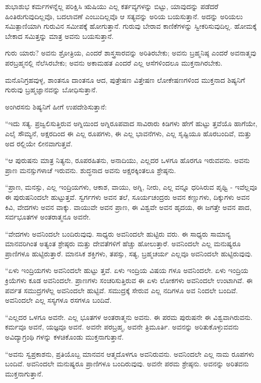 ಶುಭಾಶುಭ ಕರ್ಮಗಳನ್ನೆಲ್ಲ ಪರಿಕ್ಷಿಸಿ ಋಷಿಯು ಎಲ್ಲ ಕರ್ತವ್ಯಗಳನ್ನು ಬಿಟ್ಟು, ಯಾವುದನ್ನು ಪಡೆದರೆ ಹಿಂತಿರುಗುವುದಿಲ್ಲವೊ, ಬದಲಾವಣೆ ಎಂಬುದಿಲ್ಲವೊ ಆ ಸತ್ಯವನ್ನು ಅರಿಯ ಬಯಸುತ್ತಾನೆ. ಅದನ್ನು ಅರಿಯಲು ಸಮಿತ್ಪಾಣಿಯಾಗಿ ಗುರುವಿನ ಸಮೀಪಕ್ಕೆ ಹೋಗುತ್ತಾನೆ. ಗುರುವು ಬೇರಾವ ಕಾಣಿಕೆಗಳನ್ನು ಸ್ವೀಕರಿಸುವುದಿಲ್ಲ. ಹೋಮಕ್ಕೆ ಬೇಕಾದ ಸಮಿತ್ತನ್ನು ಮಾತ್ರ ಅವನು ಬಯಸುತ್ತಾನೆ.

ಗುರು ಯಾರು? ಅವನು ಶ್ರೋತ್ರಿಯ, ಎಂದರೆ ಶಾಸ್ತ್ರಸಾರವನ್ನು ಅರಿತಿರಬೇಕು; ಅವನು ಬ್ರಹ್ಮನಿಷ್ಠ ಎಂದರೆ ಅವನಾತ್ಮವು ಪರಬ್ರಹ್ಮನಲ್ಲಿ ನೆಲೆಸಿರಬೇಕು; ಅವನು ಅಕಾಮಹತ ಎಂದರೆ ಎಲ್ಲ ಆಸೆಗಳಿಂದಲೂ ಮುಕ್ತನಾಗಿರಬೇಕು.

ಮನೊನಿಗ್ರಹವುಳ್ಳ, ಶಾಂತನೂ ದಾಂತನೂ ಆದ, ಪುತ್ರೇಷಣ ವಿತ್ತೇಷಣ ಲೋಕೇಷಣಗಳಿಂದ ಮುಕ್ತನಾದ ಶಿಷ್ಯನಿಗೆ ಗುರುವು ಬ್ರಹ್ಮಜ್ಞಾನವನ್ನು ಬೋಧಿಸುತ್ತಾನೆ.

ಅಂಗಿರಸನು ಶಿಷ್ಯನಿಗೆ ಹೀಗೆ ಉಪದೇಶಿಸುತ್ತಾನೆ:

“ಇದು ಸತ್ಯ. ಪ್ರಜ್ವಲಿಸುತ್ತಿರುವ ಅಗ್ನಿಯಿಂದ ಅಗ್ನಿರೂಪವಾದ ಸಾವಿರಾರು ಕಿಡಿಗಳು ಹೇಗೆ ಹುಟ್ಟು ತ್ತವೆಯೊ ಹಾಗೆಯೇ, ಎಲೈ ಸೌಮ್ಯನೆ, ಅಕ್ಷರದಿಂದ ಈ ಎಲ್ಲ ರೂಪಗಳು, ಈ ಎಲ್ಲ ಭಾವನೆಗಳು, ಎಲ್ಲ ಸೃಷ್ಟಿಯೂ ಹೊರಬಂದಿವೆ, ಮತ್ತು ಅದ ರಲ್ಲಿಯೇ ಲೀನವಾಗುತ್ತವೆ.

“ಆ ಪುರುಷನು ಮಾತ್ರ ನಿತ್ಯನು, ರೂಪರಹಿತನು, ಅನಾದಿಯು, ಎಲ್ಲದರ ಒಳಗೂ ಹೊರಗೂ ಇರುವವನು. ಅವನು ಪ್ರಾಣ ಮನಸ್ಸುಗಳಾಚೆ ಇರುವನು. ಶುದ್ಧನಾದ ಅವನು ಅಕ್ಷರಕ್ಕಿಂತಲೂ ಶ್ರೇಷ್ಠನು.

“ಪ್ರಾಣ, ಮನಸ್ಸು, ಎಲ್ಲ ಇಂದ್ರಿಯಗಳು, ಆಕಾಶ, ವಾಯು, ಅಗ್ನಿ, ನೀರು, ಎಲ್ಲ ವನ್ನೂ ಧರಿಸಿರುವ ಪೃಥ್ವಿ - ಇವೆಲ್ಲವೂ ಈ ಪುರುಷನಿಂದಲೇ ಹುಟ್ಟುತ್ತವೆ. ಸ್ವರ್ಗಗಳು ಅವನ ತಲೆ, ಸೂರ್ಯಚಂದ್ರರು ಅವನ ಕಣ್ಣುಗಳು, ದಿಕ್ಕುಗಳು ಅವನ ಕಿವಿ, ವೇದಗಳು ಅವನ ವಾಕ್ಕು. ವಾಯುವೇ ಅವನ ಪ್ರಾಣ, ಈ ವಿಶ್ವವೇ ಅವನ ಹೃದಯ, ಈ ಜಗತ್ತೇ ಅವನ ಪಾದ, ಸರ್ವಭೂತಗಳ ಅಂತರಾತ್ಮನೂ ಅವನೇ.

“ವೇದಗಳು ಅವನಿಂದಲೇ ಬಂದಿರುವುವು. ಸಾಧ್ಯರು ಅವನಿಂದಲೇ ಹುಟ್ಟಿರು ವರು. ಈ ಸಾಧ್ಯರು ಸಾಮಾನ್ಯ ಮಾನವರಿಗಿಂತ ಅತ್ಯಂತ ಶ್ರೇಷ್ಠರು ಮತ್ತು ದೇವತೆಗಳಿಗೆ ಹೆಚ್ಚು ಹೋಲುತ್ತಾರೆ. ಅವನಿಂದಲೇ ಎಲ್ಲ ಮನುಷ್ಯರೂ ಪ್ರಾಣಿಗಳೂ ಹುಟ್ಟಿರುತ್ತಾರೆ. ಮಾನಸಿಕ ಶಕ್ತಿಗಳು, ತಪಸ್ಸು, ಸತ್ಯ, ಬ್ರಹ್ಮಚರ್ಯ ಎಲ್ಲವೂ ಅವನಿಂದಲೇ ಹುಟ್ಟಿರುವುವು.

“ಏಳು ಇಂದ್ರಿಯಗಳು ಅವನಿಂದಲೇ ಹುಟ್ಟು ತ್ತವೆ. ಏಳು ಇಂದ್ರಿಯ ವಿಷಯ ಗಳೂ ಅವನಿಂದಲೇ. ಏಳು ಇಂದ್ರಿಯ ಕ್ರಿಯೆಗಳು ಕೂಡ ಅವನಿಂದಲೇ. ಪ್ರಾಣಗಳು ಸಂಚರಿಸುತ್ತಿರುವ ಈ ಏಳು ಲೋಕಗಳು ಅವನಿಂದಲೇ ಉಂಟಾಗಿವೆ. ಈ ಪರ್ವತ ಸಮುದ್ರಗಳೆಲ್ಲ ಅವನಿಂದಲೇ ಹುಟ್ಟಿವೆ. ಸಮುದ್ರಕ್ಕೆ ಸೇರುವ ಎಲ್ಲ ನದಿಗಳೂ ಅವ ನಿಂದಲೇ ಬಂದಿವೆ. ಅವನಿಂದಲೇ ಎಲ್ಲ ಸಸ್ಯಗಳೂ ರಸಗಳೂ ಬಂದಿವೆ.

“ಎಲ್ಲದರ ಒಳಗೂ ಅವನೇ. ಎಲ್ಲ ಭೂತಗಳ ಅಂತರಾತ್ಮನು ಅವನು. ಈ ಪರಮ ಪುರುಷನೇ ಈ ವಿಶ್ವವಾಗಿರುವನು. ಕರ್ಮವೂ ಅವನೆ, ಯಜ್ಞವೂ ಅವನೆ. ಅವನೇ ಪರಬ್ರಹ್ಮ, ಅವನೇ ತ್ರಿಮೂರ್ತಿ. ಅವನನ್ನು ಅರಿತುಕೊಳ್ಳುವವನು ಅವಿದ್ಯಾಗ್ರಂಥಿ ಗಳನ್ನು ಕಳಚಿಕೊಂಡು ಮುಕ್ತನಾಗುತ್ತಾನೆ.

“ಅವನು ಸ್ವಪ್ರಕಾಶನು, ಪ್ರತಿಯೊಬ್ಬ ಮಾನವನ ಆತ್ಮದೊಳಗೂ ಅವನಿರುವನು. ಅವನಿಂದಲೇ ಎಲ್ಲ ನಾಮ ರೂಪಗಳು ಬಂದಿವೆ. ಅವನಿಂದಲೇ ಮನುಷ್ಯರೂ ಪ್ರಾಣಿಗಳೂ ಬಂದಿರುವುವು. ಅವನೇ ಪರಮ ಶ್ರೇಷ್ಠನು. ಅವನನ್ನು ಅರಿತವನು ಮುಕ್ತನಾಗುತ್ತಾನೆ.

